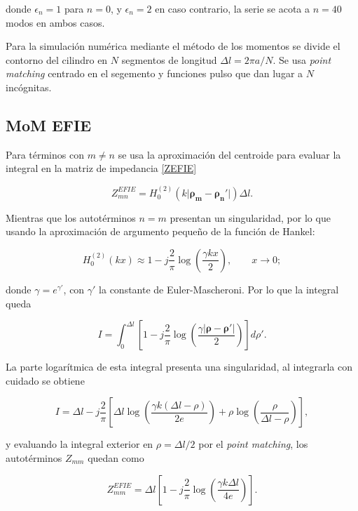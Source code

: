\documentclass[11pt,a4paper,twoside,pdf]{article}
\numberwithin{equation}{section}
\begin{document}
donde $\epsilon_n = 1$ para $n = 0$, y $\epsilon_n = 2$ en caso contrario, la serie se acota a $n = 40$ modos en ambos casos.

Para la simulación numérica mediante el método de los momentos se divide el contorno del cilindro en $N$ segmentos de longitud $\Delta l = 2\pi a / N$. Se usa \textit{point matching} centrado en el segemento y funciones pulso que dan lugar a $N$ incógnitas.


\subsection{MoM EFIE}
\label{efienum}

Para términos con $m \neq n$ se usa la aproximación del centroide para evaluar la integral en la matriz de impedancia \ref{ZEFIE}

$$
    Z^{EFIE}_{mn} =  H_0^{(2)}\!\left( k \lvert \boldsymbol{\rho_m} - \boldsymbol{\rho_n}' \rvert \right) \Delta l.
$$

Mientras que los autotérminos $n=m$ presentan un singularidad, por lo que usando la aproximación de argumento pequeño de la función de Hankel:

\begin{equation}
H_0^{(2)}(k x)
\approx
1
-
j \frac{2}{\pi}
\log\!\left( \frac{\gamma k x}{2} \right),
\qquad x \to 0;
\end{equation}

donde $\gamma = e^{\gamma'}$, con $\gamma'$ la constante de Euler-Mascheroni. Por lo que la integral queda

\begin{equation}
I
=
\int_0^{\Delta l}
\left[
1
-
j \frac{2}{\pi}
\log\!\left(
\frac{\gamma |\boldsymbol{\rho} - \boldsymbol{\rho'}|}{2}
\right)
\right]
d\rho'.
\end{equation}

La parte logarítmica de esta integral presenta una singularidad, al integrarla con cuidado se obtiene

\begin{equation}
I
=
\Delta l
-
j \frac{2}{\pi}
\left[
\Delta l
\log\!\left(
\frac{\gamma k (\Delta l - \rho)}{2 e}
\right)
+
\rho
\log\!\left(
\frac{\rho}{\Delta l - \rho}
\right)
\right],
\end{equation}

y evaluando la integral exterior en $\rho = \Delta l / 2$ por el \textit{point matching}, los autotérminos $Z_{mm}$ quedan como

\begin{equation}
Z^{EFIE}_{mm}
=
\Delta l
\left[
1
-
j \frac{2}{\pi}
\log\!\left(
\frac{\gamma k \Delta l}{4e}
\right)
\right].
\end{equation}
\end{document}
